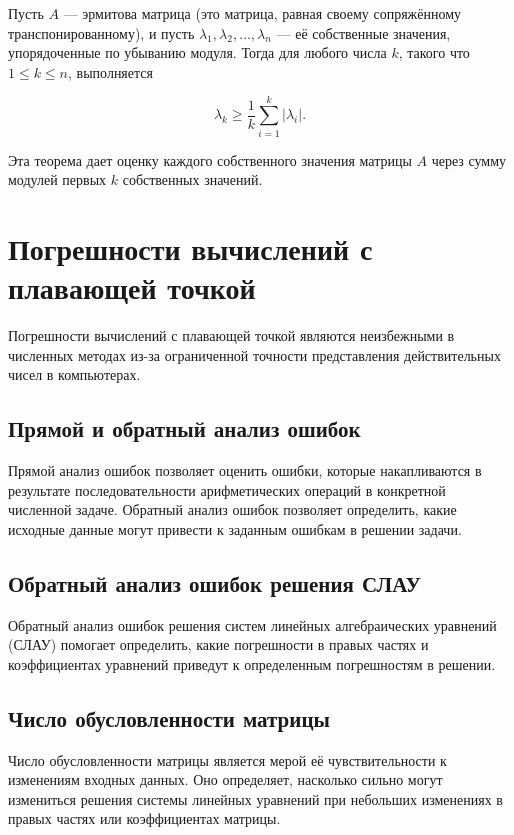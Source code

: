 \documentclass{article}
\begin{document}
Пусть \( A \) — эрмитова матрица (это матрица, равная своему сопряжённому транспонированному), и пусть \( \lambda_1, \lambda_2, \ldots, \lambda_n \) — её собственные значения, упорядоченные по убыванию модуля. Тогда для любого числа \( k \), такого что \( 1 \leq k \leq n \), выполняется

\[
\lambda_k \geq \frac{1}{k} \sum_{i=1}^k |\lambda_i|.
\]

Эта теорема дает оценку каждого собственного значения матрицы \( A \) через сумму модулей первых \( k \) собственных значений.

\section{Погрешности вычислений с плавающей точкой}

Погрешности вычислений с плавающей точкой являются неизбежными в численных методах из-за ограниченной точности представления действительных чисел в компьютерах.

\subsection{Прямой и обратный анализ ошибок}

Прямой анализ ошибок позволяет оценить ошибки, которые накапливаются в результате последовательности арифметических операций в конкретной численной задаче. Обратный анализ ошибок позволяет определить, какие исходные данные могут привести к заданным ошибкам в решении задачи.

\subsection{Обратный анализ ошибок решения СЛАУ}

Обратный анализ ошибок решения систем линейных алгебраических уравнений (СЛАУ) помогает определить, какие погрешности в правых частях и коэффициентах уравнений приведут к определенным погрешностям в решении.

\subsection{Число обусловленности матрицы}

Число обусловленности матрицы является мерой её чувствительности к изменениям входных данных. Оно определяет, насколько сильно могут измениться решения системы линейных уравнений при небольших изменениях в правых частях или коэффициентах матрицы.
\end{document}
